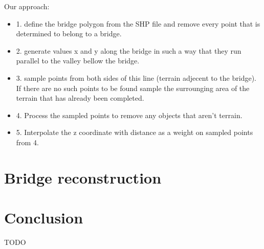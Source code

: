 \documentclass{egpubl-eurovis-star}
\begin{document}
Our approach:
\begin{itemize}
\item{1. define the bridge polygon from the SHP file and remove every point that is determined to belong to a bridge.}
\item{2. generate values x and y along the bridge in such a way that they run parallel to the valley bellow the bridge. }
\item{3. sample points from both sides of this line (terrain adjecent to the bridge). 
If there are no such points to be found sample the surrounging area of the terrain that has already been completed.}
\item{4. Process the sampled points to remove any objects that aren't terrain.}
\item{5. Interpolate the z coordinate with distance as a weight on sampled points from 4.}
\end{itemize}

\section{Bridge reconstruction}

\section{Conclusion}
TODO


%



\end{document}
